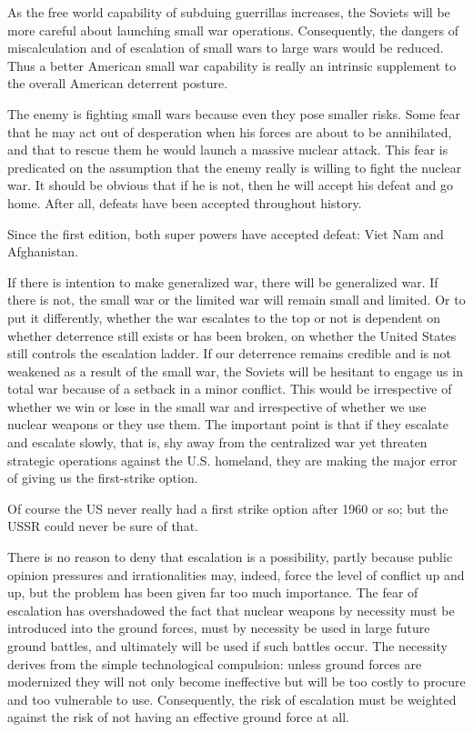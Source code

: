 As the free world capability of subduing guerrillas increases, the Soviets will be more careful about launching small war operations. Consequently, the dangers of miscalculation and of escalation of small wars to large wars would be reduced. Thus a better American small war capability is really an intrinsic supplement to the overall American deterrent posture.

The enemy is fighting small wars because even they pose smaller risks. Some fear that he may act out of desperation when his forces are about to be annihilated, and that to rescue them he would launch a massive nuclear attack. This fear is predicated on the assumption that the enemy really is willing to fight the nuclear war. It should be obvious that if he is not, then he will accept his defeat and go home. After all, defeats have been accepted throughout history.

\begin{mdframed}[backgroundcolor=black!10]
Since the first edition, both super powers have accepted defeat: Viet Nam and Afghanistan.
\end{mdframed}

If there is intention to make generalized war, there will be generalized war. If there is not, the small war or the limited war will remain small and limited. Or to put it differently, whether the war escalates to the top or not is dependent on whether deterrence still exists or has been broken, on whether the United States still controls the escalation ladder. If our deterrence remains credible and is not weakened as a result of the small war, the Soviets will be hesitant to engage us in total war because of a setback in a minor conflict. This would be irrespective of whether we win or lose in the small war and irrespective of whether we use nuclear weapons or they use them. The important point is that if they escalate and escalate slowly, that is, shy away from the centralized war yet threaten strategic operations against the U.S. homeland, they are making the major error of giving us the first-strike option.

\begin{mdframed}[backgroundcolor=black!10]
Of course the US never really had a first strike option after 1960 or so; but the USSR could never be sure of that.
\end{mdframed}

There is no reason to deny that escalation is a possibility, partly because public opinion pressures and irrationalities may, indeed, force the level of conflict up and up, but the problem has been given far too much importance. The fear of escalation has overshadowed the fact that nuclear weapons by necessity must be introduced into the ground forces, must by necessity be used in large future ground battles, and ultimately will be used if such battles occur. The necessity derives from the simple technological compulsion: unless ground forces are modernized they will not only become ineffective but will be too costly to procure and too vulnerable to use. Consequently, the risk of escalation must be weighted against the risk of not having an effective ground force at all.

